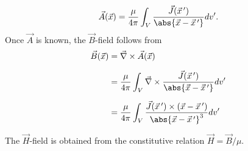 \documentclass[12pt,a4paper,oneside]{book}
\begin{document}
\begin{onehalfspace}
\begin{equation}\label{static_5}
\vec{A}(\vec{x}) = \frac{\mu}{4\pi}\int_{V}\frac{\vec{J}(\vec{x}\,')}{\abs{\vec{x}-\vec{x}\,'}}dv'.
\end{equation} 
Once $\vec{A}$ is known, the $\vec{B}$-field follows from
\begin{equation}\label{static_6}
	\begin{aligned}
		\vec{B}(\vec{x})&=\vec{\nabla}\times\vec{A}(\vec{x}) \\[6pt]
	&=\frac{\mu}{4\pi}\int_{V}\vec{\nabla}\times\frac{\vec{J}(\vec{x}\,')}{\abs{\vec{x}-\vec{x}\,'}}dv' \\[6pt]
	&= \frac{\mu}{4\pi}\int_{V}\frac{\vec{J}(\vec{x}\,')\times(\vec{x}-\vec{x}\,')}{\abs{\vec{x}-\vec{x}\,'}^3}dv'
	\end{aligned}
\end{equation} 

The $\vec{H}$-field is obtained from the constitutive relation $\vec{H}=\vec{B}/\mu$. 


\end{onehalfspace}
\end{document}

